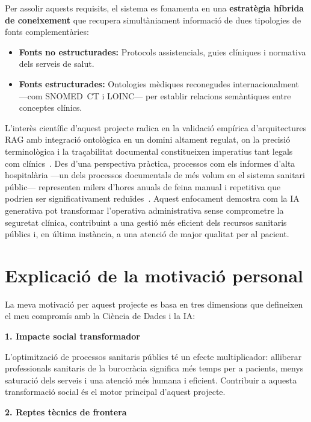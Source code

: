 \documentclass[11pt,a4paper]{article}
\begin{document}
Per assolir aquests requisits, el sistema es fonamenta en una 
\textbf{estratègia híbrida de coneixement} que recupera simultàniament 
informació de dues tipologies de fonts complementàries:

\begin{itemize}
    \item \textbf{Fonts no estructurades:} Protocols assistencials, guies clíniques i normativa dels serveis de salut.
    \item \textbf{Fonts estructurades:} Ontologies mèdiques reconegudes internacionalment ---com SNOMED~CT i LOINC--- per establir relacions 
    semàntiques entre conceptes clínics.
\end{itemize}


L'interès científic d'aquest projecte radica en la validació empírica d'arquitectures RAG amb integració ontològica en un domini altament regulat, on la precisió terminològica i la traçabilitat documental constitueixen imperatius tant legals com clínics~\cite{lewis2020retrieval}. Des d'una perspectiva pràctica, processos com els informes d'alta hospitalària ---un dels processos documentals de més volum en el sistema sanitari públic--- representen milers d'hores anuals de feina manual i repetitiva que podrien ser significativament reduïdes~\cite{sinsky2016allocation}. Aquest enfocament demostra com la IA generativa pot transformar l'operativa administrativa sense comprometre la seguretat clínica, contribuint a una gestió més eficient dels recursos sanitaris públics i, en última instància, a una atenció de major qualitat per al pacient.


\section*{Explicació de la motivació personal}

La meva motivació per aquest projecte es basa en tres dimensions que defineixen el meu compromís amb la Ciència de Dades i la IA:

\textbf{1. Impacte social transformador}  

L'optimització de processos sanitaris públics té un efecte multiplicador: alliberar professionals sanitaris de la burocràcia significa més temps per a pacients, menys saturació dels serveis i una atenció més humana i eficient. Contribuir a aquesta transformació social és el motor principal d'aquest projecte.

\textbf{2. Reptes tècnics de frontera}  
\end{document}
